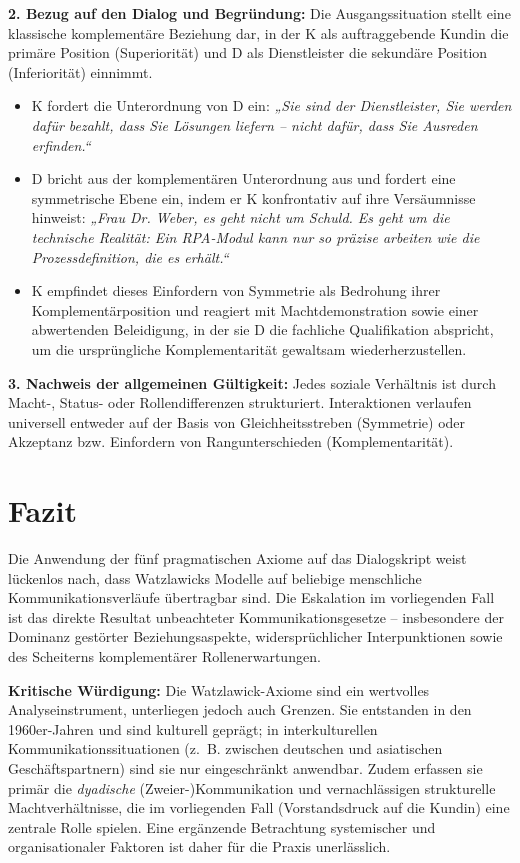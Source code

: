 \textbf{2. Bezug auf den Dialog und Begründung:}
Die Ausgangssituation stellt eine klassische komplementäre Beziehung dar, in der K als auftraggebende Kundin die primäre Position (Superiorität) und D als Dienstleister die sekundäre Position (Inferiorität) einnimmt.
\begin{itemize}
    \item K fordert die Unterordnung von D ein: \textit{„Sie sind der Dienstleister, Sie werden dafür bezahlt, dass Sie Lösungen liefern – nicht dafür, dass Sie Ausreden erfinden.“}
    \item D bricht aus der komplementären Unterordnung aus und fordert eine symmetrische Ebene ein, indem er K konfrontativ auf ihre Versäumnisse hinweist: \textit{„Frau Dr. Weber, es geht nicht um Schuld. Es geht um die technische Realität: Ein \acs{RPA}-Modul kann nur so präzise arbeiten wie die Prozessdefinition, die es erhält.“}
    \item K empfindet dieses Einfordern von Symmetrie als Bedrohung ihrer Komplementärposition und reagiert mit Machtdemonstration sowie einer abwertenden Beleidigung, in der sie D die fachliche Qualifikation abspricht, um die ursprüngliche Komplementarität gewaltsam wiederherzustellen.
\end{itemize}

\textbf{3. Nachweis der allgemeinen Gültigkeit:}
Jedes soziale Verhältnis ist durch Macht-, Status- oder Rollendifferenzen strukturiert. Interaktionen verlaufen universell entweder auf der Basis von Gleichheitsstreben (Symmetrie) oder Akzeptanz bzw. Einfordern von Rangunterschieden (Komplementarität).

\section{Fazit}
Die Anwendung der fünf pragmatischen Axiome auf das Dialogskript weist lückenlos nach, dass Watzlawicks Modelle auf beliebige menschliche Kommunikationsverläufe übertragbar sind. Die Eskalation im vorliegenden Fall ist das direkte Resultat unbeachteter Kommunikationsgesetze – insbesondere der Dominanz gestörter Beziehungsaspekte, widersprüchlicher Interpunktionen sowie des Scheiterns komplementärer Rollenerwartungen.

\textbf{Kritische Würdigung:} Die Watzlawick-Axiome sind ein wertvolles Analyseinstrument, unterliegen jedoch auch Grenzen. Sie entstanden in den 1960er-Jahren und sind kulturell geprägt; in interkulturellen Kommunikationssituationen (z.~B. zwischen deutschen und asiatischen Geschäftspartnern) sind sie nur eingeschränkt anwendbar. Zudem erfassen sie primär die \textit{dyadische} (Zweier-)Kommunikation und vernachlässigen strukturelle Machtverhältnisse, die im vorliegenden Fall (Vorstandsdruck auf die Kundin) eine zentrale Rolle spielen. Eine ergänzende Betrachtung systemischer und organisationaler Faktoren ist daher für die Praxis unerlässlich.

